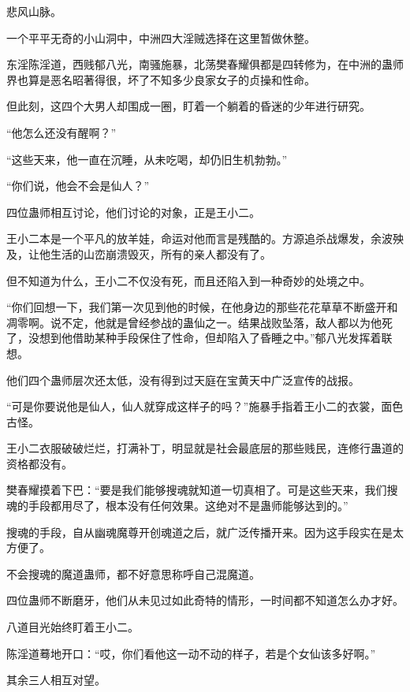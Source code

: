 
\begin{this_body}

悲风山脉。

一个平平无奇的小山洞中，中洲四大淫贼选择在这里暂做休整。

东淫陈淫道，西贱郁八光，南骚施暴，北荡樊春耀俱都是四转修为，在中洲的蛊师界也算是恶名昭著得很，坏了不知多少良家女子的贞操和性命。

但此刻，这四个大男人却围成一圈，盯着一个躺着的昏迷的少年进行研究。

“他怎么还没有醒啊？”

“这些天来，他一直在沉睡，从未吃喝，却仍旧生机勃勃。”

“你们说，他会不会是仙人？”

四位蛊师相互讨论，他们讨论的对象，正是王小二。

王小二本是一个平凡的放羊娃，命运对他而言是残酷的。方源追杀战爆发，余波殃及，让他生活的山峦崩溃毁灭，所有的亲人都没有了。

但不知道为什么，王小二不仅没有死，而且还陷入到一种奇妙的处境之中。

“你们回想一下，我们第一次见到他的时候，在他身边的那些花花草草不断盛开和凋零啊。说不定，他就是曾经参战的蛊仙之一。结果战败坠落，敌人都以为他死了，没想到他借助某种手段保住了性命，但却陷入了昏睡之中。”郁八光发挥着联想。

他们四个蛊师层次还太低，没有得到过天庭在宝黄天中广泛宣传的战报。

“可是你要说他是仙人，仙人就穿成这样子的吗？”施暴手指着王小二的衣裳，面色古怪。

王小二衣服破破烂烂，打满补丁，明显就是社会最底层的那些贱民，连修行蛊道的资格都没有。

樊春耀摸着下巴：“要是我们能够搜魂就知道一切真相了。可是这些天来，我们搜魂的手段都用尽了，根本没有任何效果。这绝对不是蛊师能够达到的。”

搜魂的手段，自从幽魂魔尊开创魂道之后，就广泛传播开来。因为这手段实在是太方便了。

不会搜魂的魔道蛊师，都不好意思称呼自己混魔道。

四位蛊师不断磨牙，他们从未见过如此奇特的情形，一时间都不知道怎么办才好。

八道目光始终盯着王小二。

陈淫道蓦地开口：“哎，你们看他这一动不动的样子，若是个女仙该多好啊。”

其余三人相互对望。


\end{this_body}

